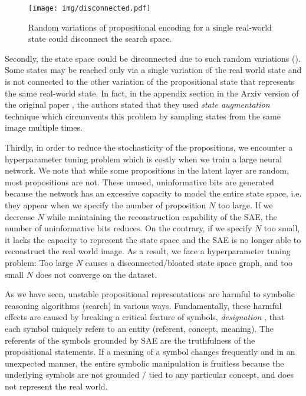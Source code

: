 \begin{figure}[htb]
 \centering
 \texttt{[image: img/disconnected.pdf]}
 \caption{Random variations of propositional encoding for a single real-world state could disconnect the search space.}
 \label{disconnected}
\end{figure}

Secondly, the state space could be disconnected due to such random variations ().
Some states may be reached only via a single variation of the real world state and is not connected to the
other variation of the propositional state that represents the same real-world state.
In fact, in the appendix section in the Arxiv version of the original paper \cite{Asai2018},
the authors stated that they used \emph{state augmentation} technique
which circumvents this problem by sampling states from the same image multiple times.

Thirdly, in order to reduce the stochasticity of the propositions, we encounter a hyperparameter tuning problem
which is costly when we train a large neural network.
We note that while some propositions in the latent layer are random, most propositions are not.
These unused, uninformative bits are generated because the network has an excessive capacity to 
model the entire state space, i.e. they appear when we specify the number of proposition $N$ too large.
If we decrease $N$ while maintaining the reconstruction capability of the SAE, the number of uninformative bits
reduces.
On the contrary, if we specify $N$ too small, it lacks the capacity to represent the state space
and the SAE is no longer able to reconstruct the
real world image.
As a result, we face a hyperparameter tuning problem: Too large $N$ causes a disconnected/bloated state space graph,
and too small $N$ does not converge on the dataset.


As we have seen, unstable propositional representations are harmful to symbolic reasoning algorithms (search)
in various ways.
Fundamentally,
these harmful effects are caused by breaking a critical feature of symbols, \emph{designation} \cite{newell1976computer,newell1980physical},
that each symbol uniquely refers to an entity (referent, concept, meaning).
The referents of the symbols grounded by SAE are the truthfulness of the propositional statements.
If a meaning of a symbol changes frequently and in an unexpected manner, the entire symbolic manipulation is fruitless
because the underlying symbols are not grounded / tied to any particular concept, and does not represent the real world.

